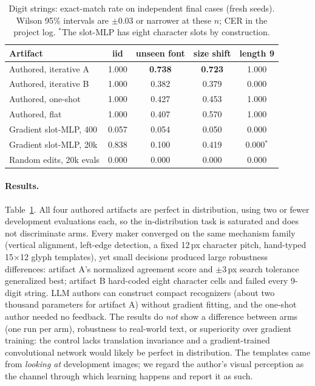 \documentclass[11pt]{article}
\begin{document}
\begin{table}[!htbp]
\centering\small
\begin{tabular}{lcccc}
\toprule
Artifact & iid & unseen font & size shift & length 9\\
\midrule
Authored, iterative A & 1.000 & \textbf{0.738} & \textbf{0.723} & 1.000\\
Authored, iterative B & 1.000 & 0.382 & 0.379 & 0.000\\
Authored, one-shot & 1.000 & 0.427 & 0.453 & 1.000\\
Authored, flat & 1.000 & 0.407 & 0.570 & 1.000\\
Gradient slot-MLP, 400 & 0.057 & 0.054 & 0.050 & 0.000\\
Gradient slot-MLP, 20k & 0.838 & 0.100 & 0.419 & 0.000$^\ast$\\
Random edits, 20k evals & 0.000 & 0.000 & 0.000 & 0.000\\
\bottomrule
\end{tabular}
\caption{Digit strings: exact-match rate on independent final cases (fresh seeds). Wilson 95\%
intervals are $\pm$0.03 or narrower at these $n$; CER in the project log. $^\ast$The slot-MLP has
eight character slots by construction.}
\label{tab:r1}
\end{table}

\paragraph{Results.} Table~\ref{tab:r1}. All four authored artifacts are perfect in
distribution, using two or fewer development evaluations each, so the in-distribution task is
saturated and does not discriminate arms. Every maker converged on the same mechanism family
(vertical alignment, left-edge detection, a fixed 12\,px character pitch, hand-typed
15$\times$12 glyph templates), yet small decisions produced large robustness differences:
artifact A's normalized agreement score and $\pm3$\,px search tolerance generalized best;
artifact B hard-coded eight character cells and failed every 9-digit string. LLM authors can
construct compact recognizers (about two thousand parameters for artifact A) without gradient
fitting, and the one-shot author needed no feedback. The results do \emph{not} show a difference
between arms (one run per arm), robustness to real-world text, or superiority over gradient
training: the control lacks translation invariance and a gradient-trained convolutional network
would likely be perfect in distribution. The templates came from \emph{looking at} development
images; we regard the author's visual perception as the channel through which learning happens
and report it as such.
\end{document}
